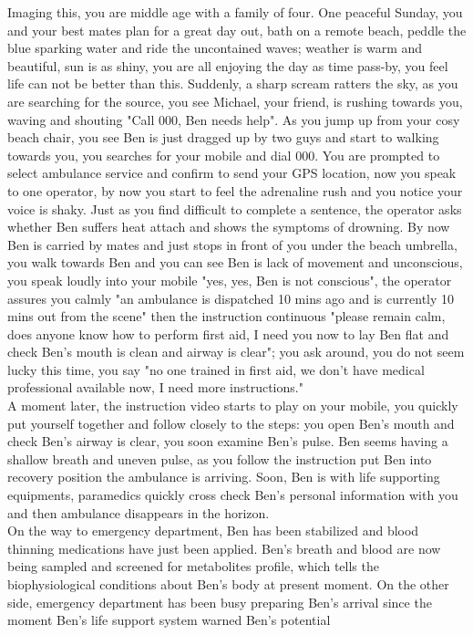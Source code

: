 Imaging this, you are middle age with a family of four. One peaceful Sunday, you and your best mates plan for a great day out, bath on a remote beach, peddle the blue sparking water and ride the uncontained waves; weather is warm and beautiful, sun is as shiny, you are all enjoying the day as time pass-by, you feel life can not be better than this. Suddenly, a sharp scream ratters the sky, as you are searching for the source, you see Michael, your friend, is rushing towards you, waving and shouting "Call 000, Ben needs help". As you jump up from your cosy beach chair, you see Ben is just dragged up by two guys and start to walking towards you, you searches for your mobile and dial 000. You are prompted to select ambulance service and confirm to send your GPS location, now you speak to one operator, by now you start to feel the adrenaline rush and you notice your voice is shaky. Just as you find difficult to complete a sentence, the operator asks whether Ben suffers heat attach and shows the symptoms of drowning. By now Ben is carried by mates and just stops in front of you under the beach umbrella, you walk towards Ben and you can see Ben is lack of movement and unconscious, you speak loudly into your mobile "yes, yes, Ben is not conscious", the operator assures you calmly "an ambulance is dispatched 10 mins ago and is currently 10 mins out from the scene" then the instruction continuous "please remain calm, does anyone know how to perform first aid, I need you now to lay Ben flat and check Ben's mouth is clean and airway is clear"; you ask around, you do not seem lucky this time, you say "no one trained in first aid, we don't have medical professional available now, I need more instructions." \\
A moment later, the instruction video starts to play on your mobile, you quickly put yourself together and follow closely to the steps: you open Ben's mouth and check Ben's airway is clear, you soon examine Ben's pulse. Ben seems having a shallow breath and uneven pulse, as you follow the instruction put Ben into recovery position the ambulance is arriving. Soon, Ben is with life supporting equipments, paramedics quickly cross check Ben's personal information with you and then ambulance disappears in the horizon. \\
On the way to emergency department, Ben has been stabilized and blood thinning medications have just been applied. Ben's breath and blood are now being sampled and screened for metabolites profile, which tells the biophysiological conditions about Ben's body at present moment. On the other side, emergency department has been busy preparing Ben's arrival since the moment Ben's life support system warned Ben's potential 